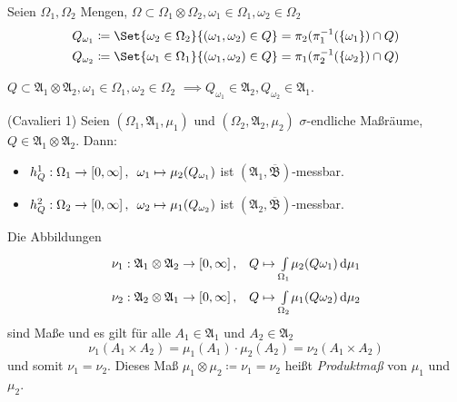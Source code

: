 \documentclass{cheat-sheet}
\newcommand{\Alg}{\mathfrak{A}} %
\newcommand{\Bor}{\mathfrak{B}} %
\theoremstyle{definition}
\begin{document}
\begin{nota}
  Seien $\Omega_1, \Omega_2$ Mengen, $\Omega \subset \Omega_1 \otimes \Omega_2, \omega_1 \in \Omega_1, \omega_2 \in \Omega_2$
  \begin{align*}
    Q_{\omega_1} &\coloneqq \Set{ \omega_2 \in \Omega_2 }{ (\omega_1, \omega_2) \in Q } = \pi_2(\pi_1^{-1}(\{ \omega_1 \}) \cap Q)\\
    Q_{\omega_2} &\coloneqq \Set{ \omega_1 \in \Omega_1 }{ (\omega_1, \omega_2) \in Q } = \pi_1(\pi_2^{-1}(\{ \omega_2 \}) \cap Q)
  \end{align*}
\end{nota}

\begin{satz} %
  $Q \subset \Alg_1 \otimes \Alg_2, \omega_1 \in \Omega_1, \omega_2 \in \Omega_2$
  $\implies Q_{\omega_1} \in \Alg_2, Q_{\omega_2} \in \Alg_1$.
\end{satz}

\begin{satz}(Cavalieri 1) %
  Seien $(\Omega_1, \Alg_1, \mu_1)$ und $(\Omega_2, \Alg_2, \mu_2)$ $\sigma$-endliche Maßräume, $Q \in \Alg_1 \otimes \Alg_2$. Dann:
  \begin{itemize}
    \item $h_Q^1 : \Omega_1 \to \left[ 0, \infty \right], \enspace \omega_1 \mapsto \mu_2(Q_{\omega_1})$ \enspace ist $(\Alg_1, \overline{\Bor})$-messbar.
    \item $h_Q^2 : \Omega_2 \to \left[ 0, \infty \right], \enspace \omega_2 \mapsto \mu_1(Q_{\omega_2})$ \enspace ist $(\Alg_2, \overline{\Bor})$-messbar.
  \end{itemize}
\end{satz}


\begin{satz}
  Die Abbildungen
  \begin{align*}
    \nu_1 : \Alg_1 \otimes \Alg_2 \to \cinterval{0}{\infty}, \quad & Q \mapsto \Int{\Omega_1}{}{\mu_2(Q \omega_1)}{\mu_1} \\
    \nu_2 : \Alg_2 \otimes \Alg_1 \to \cinterval{0}{\infty}, \quad & Q \mapsto \Int{\Omega_2}{}{\mu_1(Q \omega_2)}{\mu_2}
  \end{align*}
  sind Maße und es gilt für alle $A_1 \in \Alg_1$ und $A_2 \in \Alg_2$
  \[ \nu_1(A_1 \times A_2) = \mu_1(A_1) \cdot \mu_2(A_2) = \nu_2(A_1 \times A_2) \]
  und somit $\nu_1 = \nu_2$. Dieses Maß $\mu_1 \otimes \mu_2 \coloneqq \nu_1 = \nu_2$ heißt \emph{Produktmaß} von $\mu_1$ und $\mu_2$.
\end{satz}
\end{document}
